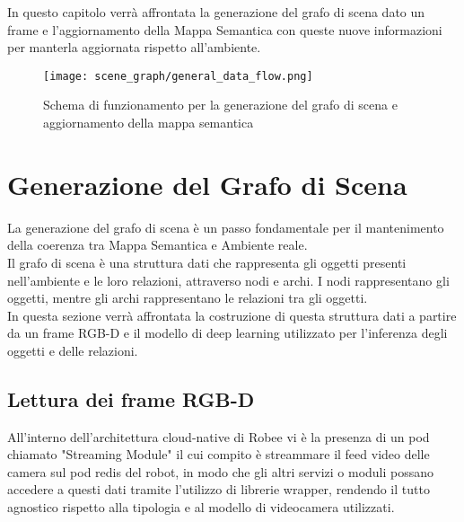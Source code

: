 In questo capitolo verrà affrontata la generazione del grafo di scena dato un frame e l'aggiornamento della Mappa Semantica con queste nuove informazioni per manterla aggiornata rispetto all'ambiente.
\begin{figure}[h]
  \texttt{[image: scene\_graph/general\_data\_flow.png]}
  \caption{Schema di funzionamento per la generazione del grafo di scena e aggiornamento della mappa semantica }
\end{figure}

\section{Generazione del Grafo di Scena}
La generazione del grafo di scena è un passo fondamentale per il mantenimento della coerenza tra Mappa Semantica e Ambiente reale.\\
Il grafo di scena è una struttura dati che rappresenta gli oggetti presenti nell'ambiente e le loro relazioni, attraverso nodi e archi. I nodi rappresentano gli oggetti, mentre gli archi rappresentano le relazioni tra gli oggetti. \\
In questa sezione verrà affrontata la costruzione di questa struttura dati a partire da un frame RGB-D e il modello di deep learning utilizzato per l'inferenza degli oggetti e delle relazioni.
\subsection{Lettura dei frame RGB-D}
All'interno dell'architettura cloud-native di Robee vi è la presenza di un pod chiamato "Streaming Module" il cui compito è streammare il feed video delle camera sul pod redis del robot, in modo che gli altri servizi o moduli possano accedere a questi dati tramite l'utilizzo di librerie wrapper, rendendo il tutto agnostico rispetto alla tipologia e al modello di videocamera utilizzati.

